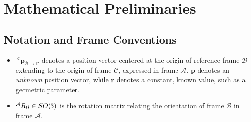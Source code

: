 \section{Mathematical Preliminaries}

\subsection{Notation and Frame Conventions}

\begin{itemize}
  \item ${}^\mathcal{A}\mathbf{p}_{\mathcal{B}\to \mathcal{C}}$ denotes a position vector centered at the origin of reference frame $\mathcal{B}$ extending to the origin of frame $\mathcal{C}$, expressed in frame $\mathcal{A}$. $\mathbf{p}$ denotes an \textit{unknown} position vector, while $\mathbf{r}$ denotes a constant, known value, such as a geometric parameter.
  \item ${}^\mathcal{A}R_\mathcal{B}\in SO(3)$ is the rotation matrix relating the orientation of frame $\mathcal{B}$ in frame $\mathcal{A}$.
\end{itemize}

